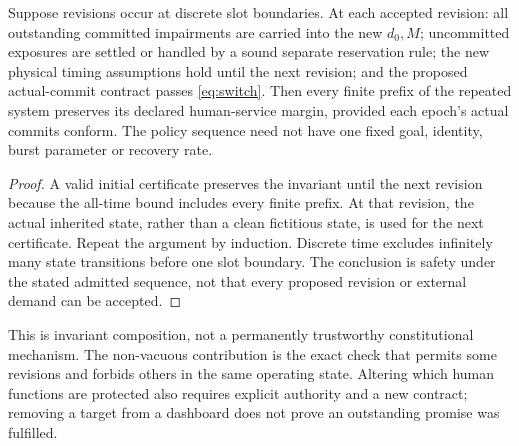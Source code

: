 \begin{proposition}
Suppose revisions occur at discrete slot boundaries. At each accepted revision: all outstanding committed impairments are carried into the new $d_0,M$; uncommitted exposures are settled or handled by a sound separate reservation rule; the new physical timing assumptions hold until the next revision; and the proposed actual-commit contract passes \cref{eq:switch}. Then every finite prefix of the repeated system preserves its declared human-service margin, provided each epoch's actual commits conform. The policy sequence need not have one fixed goal, identity, burst parameter or recovery rate.
\end{proposition}
\begin{proof}
A valid initial certificate preserves the invariant until the next revision because the all-time bound includes every finite prefix. At that revision, the actual inherited state, rather than a clean fictitious state, is used for the next certificate. Repeat the argument by induction. Discrete time excludes infinitely many state transitions before one slot boundary. The conclusion is safety under the stated admitted sequence, not that every proposed revision or external demand can be accepted.
\end{proof}
This is invariant composition, not a permanently trustworthy constitutional mechanism. The non-vacuous contribution is the exact check that permits some revisions and forbids others in the same operating state. Altering which human functions are protected also requires explicit authority and a new contract; removing a target from a dashboard does not prove an outstanding promise was fulfilled.

